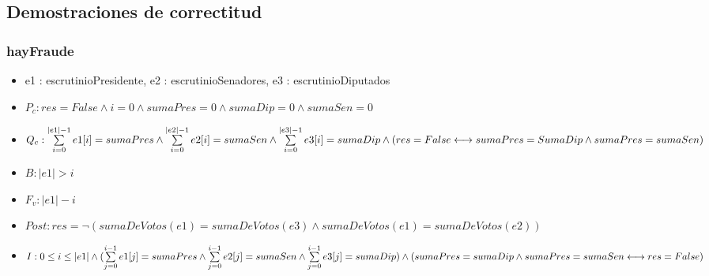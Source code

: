 \documentclass[10pt,a4paper]{article}
\begin{document}
	\subsection{Demostraciones de correctitud}
\subsubsection{hayFraude}
\begin{itemize}
        \item e1 : escrutinioPresidente, \: e2 : escrutinioSenadores, \: e3 : escrutinioDiputados
        \item $P_c : res=False \land i=0 \land sumaPres=0 \land sumaDip=0 \land sumaSen=0$
        
	\item $Q_c : \sum\limits_{i=0}^{|e1| - 1} e1[i] = sumaPres \land \sum\limits_{i=0}^{|e2| - 1} e2[i] = sumaSen \land \sum\limits_{i=0}^{|e3| - 1} e3[i] = sumaDip \land \\ 
 (res = False \longleftrightarrow sumaPres = SumaDip \land sumaPres = sumaSen)$
	\item $B : |e1| > i$
	\item $F_v : |e1| - i$
        \item $Post : res = \neg{(sumaDeVotos(e1) = sumaDeVotos(e3) \land sumaDeVotos(e1) = sumaDeVotos(e2))}$
	\item $I : 0 \leq i \leq |e1| \land (\sum\limits_{j=0}^{i - 1} e1[j] = sumaPres \land \sum\limits_{j=0}^{i - 1} e2[j] = sumaSen \land \sum\limits_{j=0}^{i - 1} e3[j] = sumaDip) \land \\
    (sumaPres = sumaDip  \land sumaPres = sumaSen \longleftrightarrow res = False)$
    
\end{itemize}
\vspace{6mm} 
\end{document}
